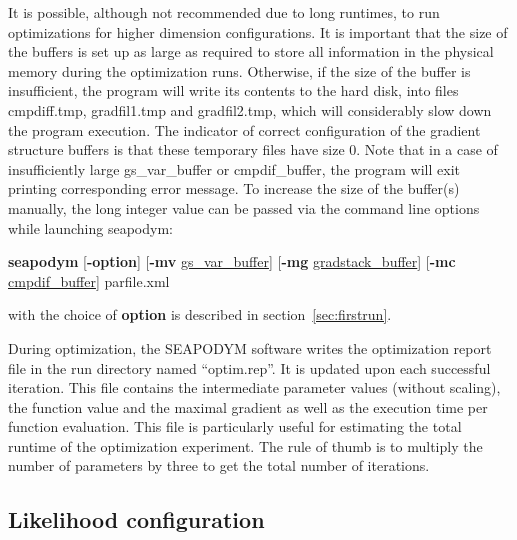 It is possible, although not recommended due to long runtimes, to run optimizations for higher dimension configurations. It is important that the size of the buffers is set up as large as required to store all information in the physical memory during the optimization runs. Otherwise, if the size of the buffer is insufficient, the program will write its contents to the hard disk, into files cmpdiff.tmp, gradfil1.tmp and gradfil2.tmp, which will considerably slow down the program execution. The indicator of correct configuration of the gradient structure buffers is that these temporary files have size 0. Note that in a case of insufficiently large {\ttfamily gs\_var\_buffer} or {\ttfamily cmpdif\_buffer}, the program will exit printing corresponding error message. To increase the size of the buffer(s) manually, the long integer value can be passed via the command line options while launching seapodym:

\vspace{0.2cm}
{\ttfamily
\indent \textbf{seapodym} [\textbf{-option}] [\textbf{-mv} \underline{gs\_var\_buffer}] [\textbf{-mg} \underline{gradstack\_buffer}]  \linebreak 
\indent \hspace{1.8cm} [\textbf{-mc} \underline{cmpdif\_buffer}] parfile.xml\\
}
\vspace{0.2cm}
 
\noindent with the choice of {\ttfamily \textbf{option}} is described in section~\ref{sec:firstrun}. 

During optimization, the SEAPODYM software writes the optimization report file in the run directory named ``optim.rep''. It is updated upon each successful iteration. This file contains the intermediate parameter values (without scaling), the function value and the maximal gradient as well as the execution time per function evaluation. This file is particularly useful for estimating the total runtime of the optimization experiment. The rule of thumb is to multiply the number of parameters by three to get the total number of iterations.

\subsection{Likelihood configuration}

